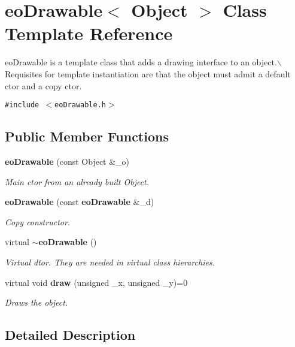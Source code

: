 \section{eo\-Drawable$<$ Object $>$ Class Template Reference}
\label{classeo_drawable}
eo\-Drawable is a template class that adds a drawing interface to an object.$\backslash$ Requisites for template instantiation are that the object must admit a default ctor and a copy ctor.  


{\tt \#include $<$eo\-Drawable.h$>$}

\subsection*{Public Member Functions}
\begin{CompactItemize}
\item 
{\bf eo\-Drawable} (const Object \&\_\-o)\label{classeo_drawable_a0}

\begin{CompactList}\small\item\em Main ctor from an already built Object. \item\end{CompactList}\item 
{\bf eo\-Drawable} (const {\bf eo\-Drawable} \&\_\-d)\label{classeo_drawable_a1}

\begin{CompactList}\small\item\em Copy constructor. \item\end{CompactList}\item 
virtual {\bf $\sim$eo\-Drawable} ()\label{classeo_drawable_a2}

\begin{CompactList}\small\item\em Virtual dtor. They are needed in virtual class hierarchies. \item\end{CompactList}\item 
virtual void {\bf draw} (unsigned \_\-x, unsigned \_\-y)=0
\begin{CompactList}\small\item\em Draws the object. \item\end{CompactList}\end{CompactItemize}


\subsection{Detailed Description}
